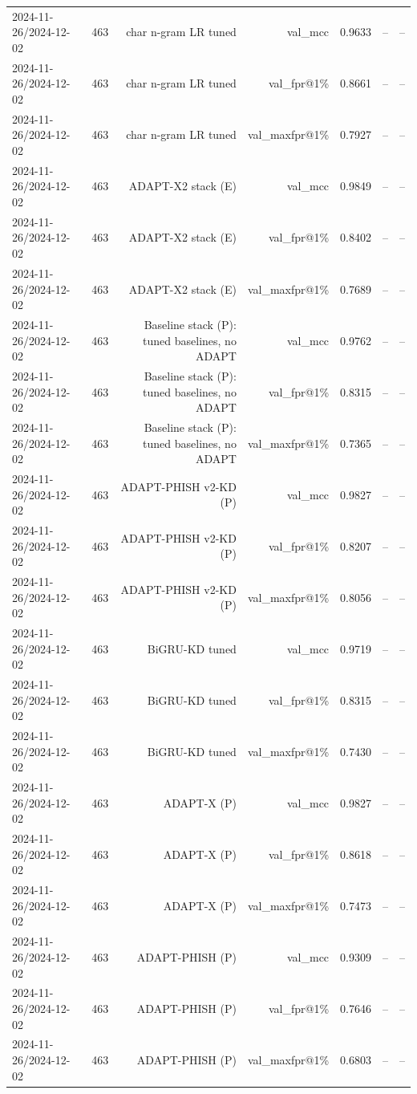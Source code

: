 \begin{table}[t]
\begin{tabular}{llrrrrr}
2024-11-26/2024-12-02 & 463 & char n-gram LR tuned & val\_mcc & 0.9633 & -- & -- \\
2024-11-26/2024-12-02 & 463 & char n-gram LR tuned & val\_fpr@1\% & 0.8661 & -- & -- \\
2024-11-26/2024-12-02 & 463 & char n-gram LR tuned & val\_maxfpr@1\% & 0.7927 & -- & -- \\
2024-11-26/2024-12-02 & 463 & ADAPT-X2 stack (E) & val\_mcc & 0.9849 & -- & -- \\
2024-11-26/2024-12-02 & 463 & ADAPT-X2 stack (E) & val\_fpr@1\% & 0.8402 & -- & -- \\
2024-11-26/2024-12-02 & 463 & ADAPT-X2 stack (E) & val\_maxfpr@1\% & 0.7689 & -- & -- \\
2024-11-26/2024-12-02 & 463 & Baseline stack (P): tuned baselines, no ADAPT & val\_mcc & 0.9762 & -- & -- \\
2024-11-26/2024-12-02 & 463 & Baseline stack (P): tuned baselines, no ADAPT & val\_fpr@1\% & 0.8315 & -- & -- \\
2024-11-26/2024-12-02 & 463 & Baseline stack (P): tuned baselines, no ADAPT & val\_maxfpr@1\% & 0.7365 & -- & -- \\
2024-11-26/2024-12-02 & 463 & ADAPT-PHISH v2-KD (P) & val\_mcc & 0.9827 & -- & -- \\
2024-11-26/2024-12-02 & 463 & ADAPT-PHISH v2-KD (P) & val\_fpr@1\% & 0.8207 & -- & -- \\
2024-11-26/2024-12-02 & 463 & ADAPT-PHISH v2-KD (P) & val\_maxfpr@1\% & 0.8056 & -- & -- \\
2024-11-26/2024-12-02 & 463 & BiGRU-KD tuned & val\_mcc & 0.9719 & -- & -- \\
2024-11-26/2024-12-02 & 463 & BiGRU-KD tuned & val\_fpr@1\% & 0.8315 & -- & -- \\
2024-11-26/2024-12-02 & 463 & BiGRU-KD tuned & val\_maxfpr@1\% & 0.7430 & -- & -- \\
2024-11-26/2024-12-02 & 463 & ADAPT-X (P) & val\_mcc & 0.9827 & -- & -- \\
2024-11-26/2024-12-02 & 463 & ADAPT-X (P) & val\_fpr@1\% & 0.8618 & -- & -- \\
2024-11-26/2024-12-02 & 463 & ADAPT-X (P) & val\_maxfpr@1\% & 0.7473 & -- & -- \\
2024-11-26/2024-12-02 & 463 & ADAPT-PHISH (P) & val\_mcc & 0.9309 & -- & -- \\
2024-11-26/2024-12-02 & 463 & ADAPT-PHISH (P) & val\_fpr@1\% & 0.7646 & -- & -- \\
2024-11-26/2024-12-02 & 463 & ADAPT-PHISH (P) & val\_maxfpr@1\% & 0.6803 & -- & -- \\

\end{tabular}
\end{table}
